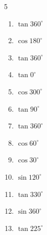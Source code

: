 \begin{multicols}{5}
\begin{enumerate}
  \item $\displaystyle \tan{360^\circ}$

        \phantom{$\displaystyle =0$}

  \item $\displaystyle \cos{180^\circ}$

        \phantom{$\displaystyle =-1$}

  \item $\displaystyle \tan{360^\circ}$

        \phantom{$\displaystyle =0$}

  \item $\displaystyle \tan{0^\circ}$

        \phantom{$\displaystyle =0$}

  \item $\displaystyle \cos{300^\circ}$


  \item $\displaystyle \tan{90^\circ}$

        \phantom{$\displaystyle なし$}

  \item $\displaystyle \tan{360^\circ}$

        \phantom{$\displaystyle =0$}

  \item $\displaystyle \cos{60^\circ}$


  \item $\displaystyle \cos{30^\circ}$


  \item $\displaystyle \sin{120^\circ}$


  \item $\displaystyle \tan{330^\circ}$


  \item $\displaystyle \sin{360^\circ}$

        \phantom{$\displaystyle =0$}

  \item $\displaystyle \tan{225^\circ}$

        \phantom{$\displaystyle =1$}


\end{enumerate}
\end{multicols}
